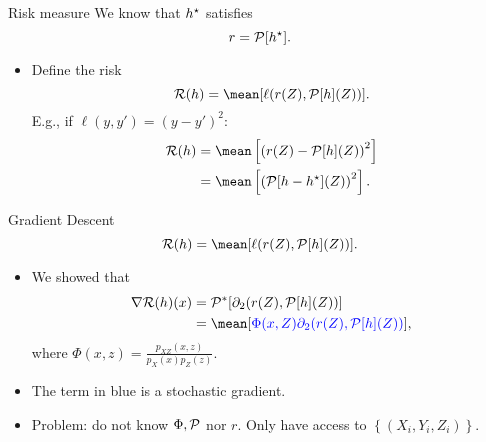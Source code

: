 \documentclass[aspectratio=169]{beamer}
\begin{document}
    \begin{frame}{Risk measure}
        We know that $ h^{ \star } $ satisfies
        \begin{equation*}
            r = \mathcal{P} [ h^{ \star } ]
        .\end{equation*}
        \begin{itemize}
            \item<2-> Define the risk
                \begin{equation*}
                    \risk ( h ) = \mean [ \ell ( r ( Z ), \meanop [ h ] ( Z ) ) ]
                .\end{equation*}
                E.g., if $ \ell ( y, y' ) = ( y - y' )^2 $:
                \begin{align*}
                    \risk ( h )
                    &= \mean \left[
                        \left(
                            r ( Z ) - \meanop [ h ] ( Z )
                        \right)^2
                    \right] \\
                    &= \mean \left[
                        \left(
                            \meanop [ h - \hstar ] ( Z )
                        \right)^2
                    \right]
                .\end{align*}
        \end{itemize}
    \end{frame}

    \begin{frame}{Gradient Descent}
        \begin{equation*}
            \risk ( h ) = \mean [ \ell ( r ( Z ), \meanop [ h ] ( Z ) ) ]
        .\end{equation*}
        \begin{itemize}
            \item<2-> We showed that
                \begin{align*}
                    \nabla \risk ( h ) ( x )
                    &= \meanop^{ * } [ \partial_{ 2 } ( r ( Z ), \meanop [ h ] ( Z ) ) ] \\
                    &= \mean [ {\color{blue} \Phi ( x, Z ) \partial_{ 2 } ( r ( Z ), \meanop [ h ] ( Z ) )} ]
                ,\end{align*}
                where $ \Phi ( x, z ) = \frac{ p_{ XZ } ( x, z ) }{ p_{ X } ( x ) p_{ Z } ( z ) } $.
            \item<3-> The term in blue is a stochastic gradient.
            \item<4-> Problem: do not know $ \Phi, \mathcal{P} $ nor $ r $.
                Only have access to $ \left\{ ( X_{ i }, Y_{ i }, Z_{ i } ) \right\} $.
        \end{itemize}
    \end{frame}
\end{document}
